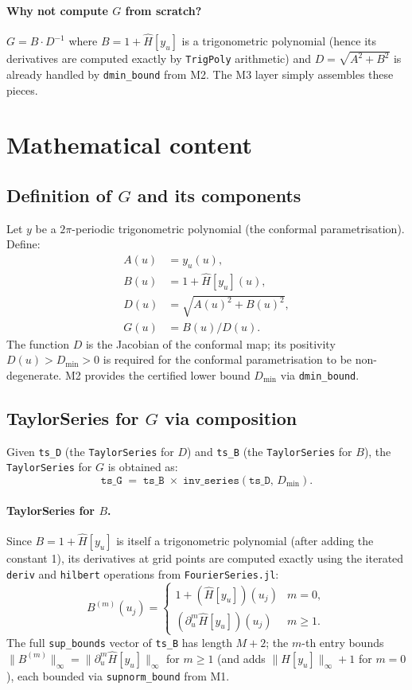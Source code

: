 \documentclass[11pt]{article}
\theoremstyle{definition}
\begin{document}
\paragraph{Why not compute $G$ from scratch?}
$G = B \cdot D^{-1}$ where $B = 1 + \hat H[y_u]$ is a trigonometric polynomial
(hence its derivatives are computed exactly by \texttt{TrigPoly} arithmetic)
and $D = \sqrt{A^2 + B^2}$ is already handled by \texttt{dmin\_bound} from M2.
The M3 layer simply assembles these pieces.

\section{Mathematical content}

\subsection{Definition of $G$ and its components}

Let $y$ be a $2\pi$-periodic trigonometric polynomial (the conformal
parametrisation).  Define:
\begin{align*}
  A(u) &= y_u(u), \\
  B(u) &= 1 + \hat H[y_u](u), \\
  D(u) &= \sqrt{A(u)^2 + B(u)^2}, \\
  G(u) &= B(u) / D(u).
\end{align*}
The function $D$ is the Jacobian of the conformal map; its positivity
$D(u) > D_{\min} > 0$ is required for the conformal parametrisation to be
non-degenerate.  M2 provides the certified lower bound $D_{\min}$ via
\texttt{dmin\_bound}.

\subsection{TaylorSeries for $G$ via composition}

Given \texttt{ts\_D} (the \texttt{TaylorSeries} for $D$) and
\texttt{ts\_B} (the \texttt{TaylorSeries} for $B$), the
\texttt{TaylorSeries} for $G$ is obtained as:
\[
  \texttt{ts\_G} \;=\; \texttt{ts\_B} \;\times\; \texttt{inv\_series}(\texttt{ts\_D},\, D_{\min}).
\]

\paragraph{TaylorSeries for $B$.}
Since $B = 1 + \hat H[y_u]$ is itself a trigonometric polynomial
(after adding the constant 1), its derivatives at grid points are computed
exactly using the iterated \texttt{deriv} and \texttt{hilbert} operations
from \texttt{FourierSeries.jl}:
\[
  B^{(m)}(u_j) = \begin{cases} 1 + (\hat H[y_u])(u_j) & m = 0, \\
  (\partial_u^m \hat H[y_u])(u_j) & m \ge 1.
  \end{cases}
\]
The full \texttt{sup\_bounds} vector of \texttt{ts\_B} has length $M{+}2$; the
$m$-th entry bounds $\|B^{(m)}\|_\infty = \|\partial_u^m \hat H[y_u]\|_\infty$
for $m \ge 1$ (and adds $\|H[y_u]\|_\infty + 1$ for $m = 0$), each bounded
via \texttt{supnorm\_bound} from M1.
\end{document}

